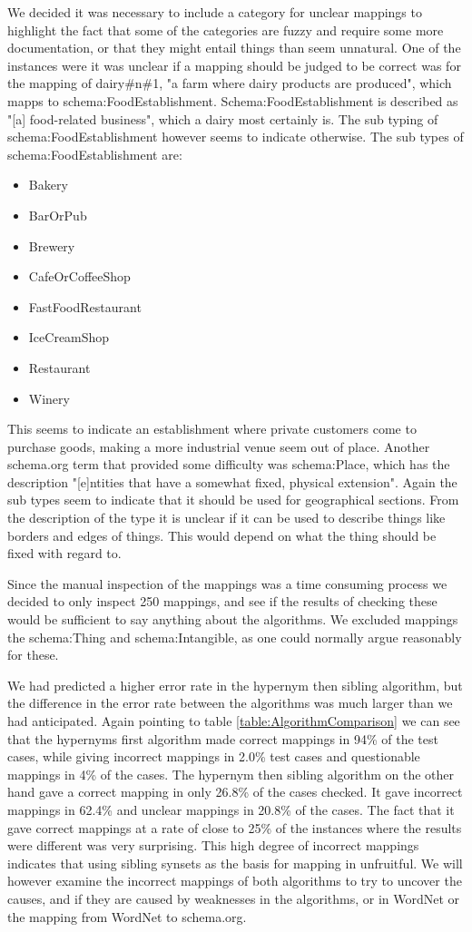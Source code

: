 We decided it was necessary to include a category for unclear mappings to highlight the fact that some of the categories
are fuzzy and require some more documentation,
or that they might entail things than seem unnatural.
One of the instances were it was unclear if a mapping should be judged to be correct was for the mapping of dairy\#n\#1,
"a farm where dairy products are produced", which mapps to schema:FoodEstablishment.
Schema:FoodEstablishment is described as "[a] food-related business", which a dairy most certainly is.
The sub typing of schema:FoodEstablishment however seems to indicate otherwise.
The sub types of schema:FoodEstablishment are:
\begin{itemize}
	\item Bakery
	\item BarOrPub
	\item Brewery
	\item CafeOrCoffeeShop
	\item FastFoodRestaurant
	\item IceCreamShop
	\item Restaurant
	\item Winery
\end{itemize}
This seems to indicate an establishment where private customers come to purchase goods,
making a more industrial venue seem out of place.
Another schema.org term that provided some difficulty was schema:Place,
which has the description "[e]ntities that have a somewhat fixed, physical extension".
Again the sub types seem to indicate that it should be used for geographical sections.
From the description of the type it is unclear if it can be used to describe things like borders and edges of things.
This would depend on what the thing should be fixed with regard to.

Since the manual inspection of the mappings was a time consuming process we decided to only inspect 250 mappings,
and see if the results of checking these would be sufficient to say anything about the algorithms.
We excluded mappings the schema:Thing and schema:Intangible, as one could normally argue reasonably for these.

We had predicted a higher error rate in the hypernym then sibling algorithm,
but the difference in the error rate between the algorithms was much larger than we had anticipated.
Again pointing to table \ref{table:AlgorithmComparison} we can see that the hypernyms first algorithm
made correct mappings in 94\% of the test cases,
while giving incorrect mappings in 2.0\% test cases and questionable mappings in 4\% of the cases.
The hypernym then sibling algorithm on the other hand gave a correct mapping in only 26.8\% of the cases checked.
It gave incorrect mappings in 62.4\% and unclear mappings in 20.8\% of the cases.
The fact that it gave correct mappings at a rate of close to 25\% of the instances where the results were different was very surprising.
This high degree of incorrect mappings indicates that using sibling synsets as the basis for mapping in unfruitful.
We will however examine the incorrect mappings of both algorithms to try to uncover the causes,
and if they are caused by weaknesses in the algorithms, or in WordNet or the mapping from WordNet to schema.org.

